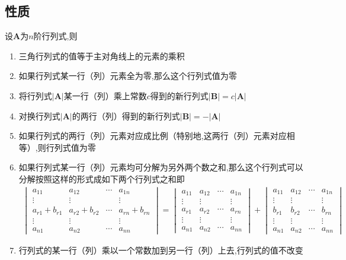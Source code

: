 \subsection{性质}
\begin{formal}
\begin{proposition}[行列式的性质]\label{prop:行列式的性质}
    设$\bm{A}$为$n$阶行列式,则
    \begin{enumerate}[label = {\textup{(\arabic*)}}]
        \item 三角行列式的值等于主对角线上的元素的乘积
        \item 如果行列式某一行（列）元素全为零,那么这个行列式值为零
        \item 将行列式$\left|\bm{A}\right|$某一行（列）乘上常数$c$得到的新行列式$\left|\bm{B}\right|=c\left|\bm{A}\right|$
        \item 对换行列式$\left|\bm{A}\right|$的两行（列）得到的新行列式$\left|\bm{B}\right|=-\left|\bm{A}\right|$
        \item 如果行列式的两行（列）元素对应成比例（特别地,这两行（列）元素对应相等）,则行列式值为零
        \item 如果行列式某一行（列）元素均可分解为另外两个数之和,那么这个行列式可以分解按照这样的形式成如下两个行列式之和即\begin{align*}
            \begin{vmatrix}
                a_{11}&a_{12}&\cdots&a_{1n}\\
                \vdots&\vdots& &\vdots\\
                a_{r1}+b_{r1}&a_{r2}+b_{r2}&\cdots&a_{rn}+b_{rn}\\
                \vdots&\vdots& &\vdots\\
                a_{n1}&a_{n2}&\cdots&a_{nn}
            \end{vmatrix}=
            \begin{vmatrix}
                a_{11}&a_{12}&\cdots&a_{1n}\\
                \vdots&\vdots& &\vdots\\
                a_{r1}&a_{r2}&\cdots&a_{rn}\\
                \vdots&\vdots& &\vdots\\
                a_{n1}&a_{n2}&\cdots&a_{nn}
            \end{vmatrix}+
            \begin{vmatrix}
                a_{11}&a_{12}&\cdots&a_{1n}\\
                \vdots&\vdots& &\vdots\\
                b_{r1}&b_{r2}&\cdots&b_{rn}\\
                \vdots&\vdots& &\vdots\\
                a_{n1}&a_{n2}&\cdots&a_{nn}
            \end{vmatrix}
        \end{align*}
        \item 行列式的某一行（列）乘以一个常数加到另一行（列）上去,行列式的值不改变
        \vfill
        

\end{enumerate}
\end{proposition}
\end{formal}
